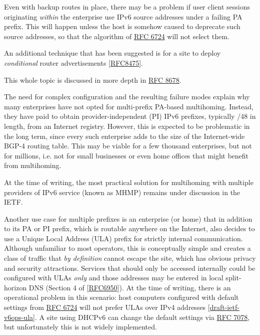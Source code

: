 \documentclass[
]{article}
\begin{document}
Even with backup routes in place, there may be a problem if user client
sessions originating \emph{within} the enterprise use IPv6 source
addresses under a failing PA prefix. This will happen unless the host is
somehow caused to deprecate such source addresses, so that the algorithm
of \href{https://www.rfc-editor.org/info/rfc6724}{RFC 6724} will not
select them.

An additional technique that has been suggested is for a site to deploy
\emph{conditional} router advertisements
{[}\href{https://www.rfc-editor.org/info/rfc8475}{RFC8475}{]}.

This whole topic is discussed in more depth in
\href{https://www.rfc-editor.org/info/rfc8678}{RFC 8678}.

The need for complex configuration and the resulting failure modes
explain why many enterprises have not opted for multi-prefix PA-based
multihoming. Instead, they have paid to obtain provider-independent (PI)
IPv6 prefixes, typically /48 in length, from an Internet registry.
However, this is expected to be problematic in the long term, since
every such enterprise adds to the size of the Internet-wide BGP-4
routing table. This may be viable for a few thousand enterprises, but
not for millions, i.e. not for small businesses or even home offices
that might benefit from multihoming.

At the time of writing, the most practical solution for multihoming with
multiple providers of IPv6 service (known as MHMP) remains under
discussion in the IETF.

Another use case for multiple prefixes is an enterprise (or home) that
in addition to its PA or PI prefix, which is routable anywhere on the
Internet, also decides to use a Unique Local Address (ULA) prefix for
strictly internal communication. Although unfamiliar to most operators,
this is conceptually simple and creates a class of traffic that \emph{by
definition} cannot escape the site, which has obvious privacy and
security attractions. Services that should only be accessed internally
could be configured with ULAs \emph{only} and those addresses may be
entered in local split-horizon DNS (Section 4 of
{[}\href{https://www.rfc-editor.org/info/rfc6950}{RFC6950}{]}). At the
time of writing, there is an operational problem in this scenario: host
computers configured with default settings from
\href{https://www.rfc-editor.org/info/rfc6724}{RFC 6724} will not prefer
ULAs over IPv4 addresses
{[}\href{https://datatracker.ietf.org/doc/draft-ietf-v6ops-ula/}{draft-ietf-v6ops-ula}{]}.
A site using DHCPv6 can change the default settings via
\href{https://www.rfc-editor.org/info/rfc7078}{RFC 7078}, but
unfortunately this is not widely implemented.
\end{document}
